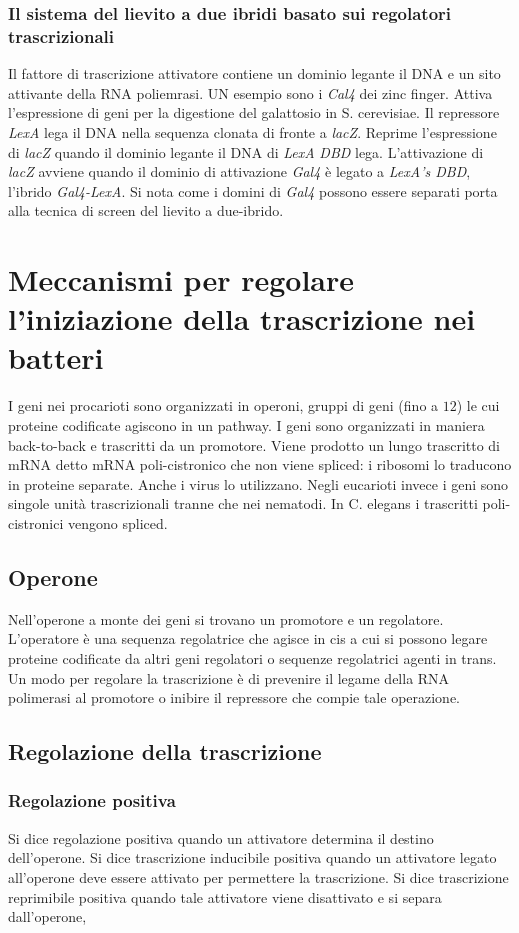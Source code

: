 \subsubsection{Il sistema del lievito a due ibridi basato sui regolatori trascrizionali}
Il fattore di trascrizione attivatore contiene un dominio legante il DNA e un sito attivante della RNA poliemrasi. UN esempio sono i \emph{Cal4} dei zinc finger. Attiva l'espressione
di geni per la digestione del galattosio in S. cerevisiae. Il repressore \emph{LexA} lega il DNA nella sequenza clonata di fronte a \emph{lacZ}. Reprime l'espressione di \emph{lacZ} 
quando il dominio  legante il DNA di \emph{LexA} \emph{DBD} lega. L'attivazione di \emph{lacZ} avviene quando il dominio di attivazione \emph{Gal4} \`e legato a \emph{LexA's DBD}, 
l'ibrido \emph{Gal4-LexA}. Si nota come i domini di \emph{Gal4} possono essere separati porta alla tecnica di screen del lievito a due-ibrido. 

\section{Meccanismi per regolare l'iniziazione della trascrizione nei batteri}
I geni nei procarioti sono organizzati in operoni, gruppi di geni (fino a $12$) le cui proteine codificate agiscono in un pathway. I geni sono organizzati in maniera back-to-back e 
trascritti da un promotore. Viene prodotto un lungo trascritto di mRNA detto mRNA poli-cistronico che non viene spliced: i ribosomi lo traducono in proteine separate. Anche i 
virus lo utilizzano. Negli eucarioti invece i geni sono singole unit\`a trascrizionali tranne che nei nematodi. In C. elegans i trascritti poli-cistronici vengono spliced. 
\subsection{Operone}
Nell'operone a monte dei geni si trovano un promotore e un regolatore. L'operatore \`e una sequenza regolatrice che agisce in cis a cui si possono legare proteine codificate da altri
geni regolatori o sequenze regolatrici agenti in trans. Un modo per regolare la trascrizione \`e di prevenire il legame della RNA polimerasi al promotore o inibire il repressore che 
compie tale operazione. 
\subsection{Regolazione della trascrizione}
\subsubsection{Regolazione positiva}
Si dice regolazione positiva quando un attivatore determina il destino dell'operone. Si dice trascrizione inducibile positiva quando un attivatore legato all'operone deve essere attivato
per permettere la trascrizione. Si dice trascrizione reprimibile positiva quando tale attivatore viene disattivato e si separa dall'operone,
